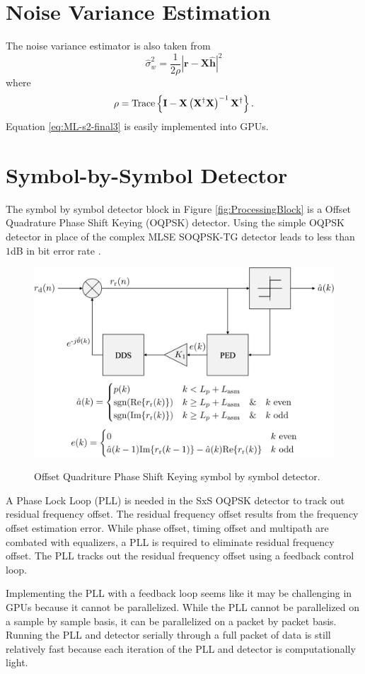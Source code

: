\section{Noise Variance Estimation}
\label{sec:noise_variance_estimation}
The noise variance estimator is also taken from \cite[eq. 9]{rice-afran-saquib-cole-rhodes-moazzami:2014}
\begin{equation}
	\hat{\sigma}_w^2 = \frac{1}{2\rho} \left| \mathbf{r}-\mathbf{X}\hat{\mathbf{h}}\right|^2
	\label{eq:ML-s2-final3}
\end{equation}
where
\begin{equation}
	\rho = {\rm Trace} \left\{ \mathbf{I} -  \mathbf{X}\left(\mathbf{X}^\dag\mathbf{X}\right)^{-1}\mathbf{X}^\dag \right\}.
\end{equation}
Equation \eqref{eq:ML-s2-final3} is easily implemented into GPUs.
	

\section{Symbol-by-Symbol Detector}
\label{sec:oqpsk_detector}
The symbol by symbol detector block in Figure \ref{fig:ProcessingBlock} is a Offset Quadrature Phase Shift Keying (OQPSK) detector.
Using the simple OQPSK detector in place of the complex MLSE SOQPSK-TG detector leads to less than $1$dB in bit error rate \cite{perrins:2013}.
\begin{figure}
	\caption{Offset Quadriture Phase Shift Keying symbol by symbol detector.}
	\centering\includegraphics[width=6in]{figures/systemOverview/OQPSK.pdf}
	\label{fig:OQPSK}
\end{figure}

A Phase Lock Loop (PLL) is needed in the SxS OQPSK detector to track out residual frequency offset.
The residual frequency offset results from the frequency offset estimation error.
While phase offset, timing offset and multipath are combated with equalizers, a PLL is required to eliminate residual frequency offset.
The PLL tracks out the residual frequency offset using a feedback control loop.

Implementing the PLL with a feedback loop seems like it may be challenging in GPUs because it cannot be parallelized.
While the PLL cannot be parallelized on a sample by sample basis, it can be parallelized on a packet by packet basis.
Running the PLL and detector serially through a full packet of data is still relatively fast because each iteration of the PLL and detector is computationally light.
